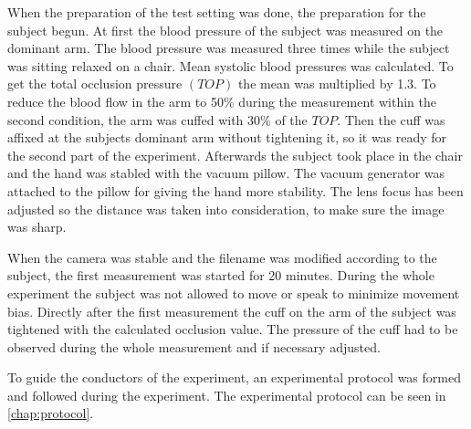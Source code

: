 When the preparation of the test setting was done, the preparation for the subject begun. At first the blood pressure of the subject was measured on the dominant arm. The blood pressure was measured three times while the subject was sitting relaxed on a chair. Mean systolic blood pressures was calculated. To get the total occlusion pressure $(TOP)$ the mean was multiplied by 1.3. To reduce the blood flow in the arm to 50\% during the measurement within the second condition, the arm was cuffed with 30\% of the $TOP$.\cite{mouser2017} 
Then the cuff was affixed at the subjects dominant arm without tightening it, so it was ready for the second part of the experiment. Afterwards the subject took place in the chair and the hand was stabled with the vacuum pillow. The vacuum generator was attached to the pillow for giving the hand more stability. The lens focus has been adjusted so the distance was taken into consideration, to make sure the image was sharp.

When the camera was stable and the filename was modified according to the subject, the first measurement was started for 20 minutes. During the whole experiment the subject was not allowed to move or speak to minimize movement bias.
Directly after the first measurement the cuff on the arm of the subject was tightened with the calculated occlusion value. The pressure of the cuff had to be observed during the whole measurement and if necessary adjusted.

To guide the conductors of the experiment, an experimental protocol was formed and followed during the experiment. The experimental protocol can be seen in \cref{chap:protocol}. 

